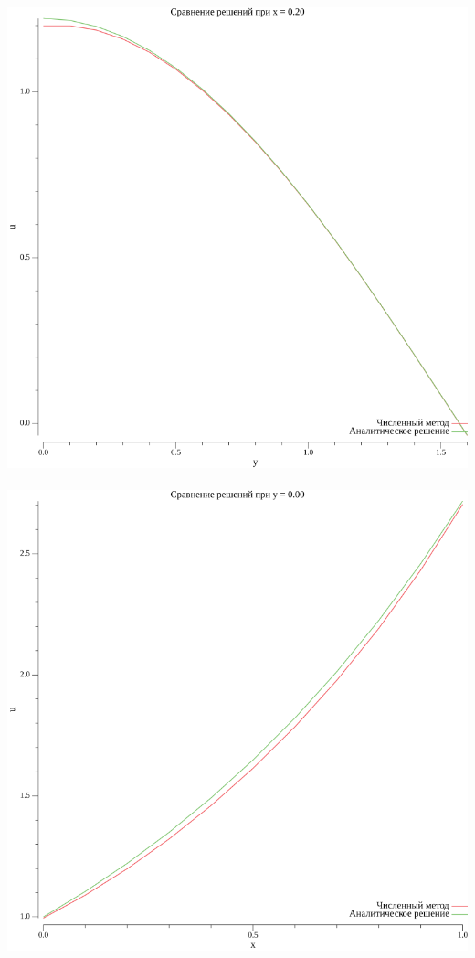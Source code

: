 \documentclass{article}
\begin{document}
\\
\includegraphics[scale=0.6]{2plot_x_0.20.png}
\\

\\
\includegraphics[scale=0.6]{2plot_y_0.00.png}
\\
\end{document}
